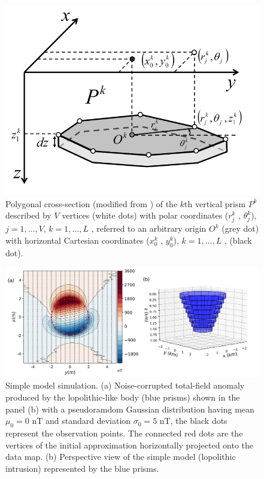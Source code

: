 \begin{figure}
    \centering
    \includegraphics[scale=0.3]{figures/prism_parameters_mod.png}
    \caption{Polygonal cross-section (modified from \cite{oliveirajr-barbosa2013}) of the $k$th vertical prism $P^k$ described by $V$ vertices (white dots) with polar coordinates ($r^k_j$ , $\theta ^k_j$), $j = 1, \dots, V$, $k = 1, \dots, L$ , referred to an arbitrary origin $O^k$ (grey dot) with horizontal Cartesian coordinates ($x_0^k$ , $y_0^k$), $k = 1, \dots, L$ , (black dot).}
    \label{fig:prism_parameters}
\end{figure}


\begin{figure}
    \centering
    \includegraphics[width=\linewidth]{figures/simple_model_data.png}
    \caption{Simple model simulation. (a) Noise-corrupted total-field anomaly produced by the lopolithic-like body (blue prisms) shown in the panel (b) with a pseudoramdom Gaussian distribution having mean $\mu_0 = 0$ nT and standard deviation $\sigma_0 = 5$ nT, the black dots represent the observation points. The connected red dots are the vertices of the initial approximation horizontally projected onto the data map. (b) Perspective view of the simple model (lopolithic intrusion) represented by the blue prisms.
}
    \label{fig:simple_model}
\end{figure}

